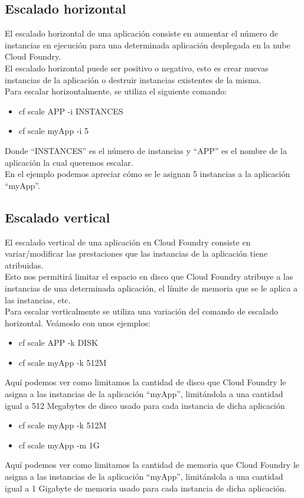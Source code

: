 \documentclass[a4paper,11pt]{article}
\begin{document}
\subsection{Escalado horizontal}
El escalado horizontal de una aplicación consiste en aumentar el número de instancias en ejecución para una determinada aplicación desplegada en la nube Cloud Foundry.\\
El escalado horizontal puede ser positivo o negativo, esto es crear nuevas instancias de la aplicación o destruir instancias existentes de la misma.\\
Para escalar horizontalmente, se utiliza el siguiente comando:\\
\begin{itemize}
  \item cf scale APP -i INSTANCES
  \item cf scale myApp -i 5
\end{itemize}
Donde “INSTANCES” es el número de instancias y “APP” es el nombre de la aplicación la cual queremos escalar.\\
En el ejemplo podemos apreciar cómo se le asignan 5 instancias a la aplicación “myApp”.\\

\subsection{Escalado vertical}
El escalado vertical de una aplicación en Cloud Foundry consiste en variar/modificar las prestaciones que las instancias de la aplicación tiene atribuidas.\\
Esto nos permitirá limitar el espacio en disco que Cloud Foundry atribuye a las instancias de una determinada aplicación, el límite de memoria que se le aplica a las instancias, etc.\\
Para escalar verticalmente se utiliza una variación del comando de escalado horizontal. Veámoslo con unos ejemplos:\\
\begin{itemize}
\item cf scale APP -k DISK
\item cf scale myApp -k 512M
\end{itemize}
Aquí podemos ver como limitamos la cantidad de disco que Cloud Foundry le asigna a las instancias de la aplicación “myApp”, limitándola a una cantidad igual a 512 Megabytes de disco usado para cada instancia de dicha aplicación
\begin{itemize}
\item cf scale myApp -k 512M
\item cf scale myApp -m 1G
\end{itemize}
Aquí podemos ver como limitamos la cantidad de memoria que Cloud Foundry le asigna a las instancias de la aplicación “myApp”, limitándola a una cantidad igual a 1 Gigabyte de memoria usado para cada instancia de dicha aplicación.
\end{document}
